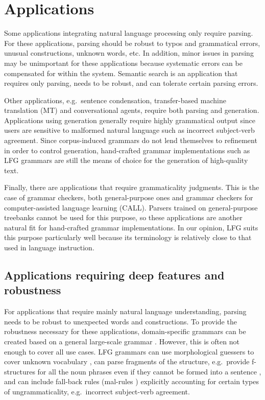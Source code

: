 \documentclass[output=paper,hidelinks]{langscibook}
\begin{document}
\section{Applications}
\label{sec:applications}

Some applications integrating natural language processing  only require parsing. For  these applications, parsing should be robust to typos and grammatical errors, unusual constructions, unknown words, etc. In addition, minor issues in parsing may be unimportant for these applications because systematic errors can be compensated for within the system. Semantic search is  an application that requires only parsing, needs to be robust, and can tolerate certain parsing errors.

Other applications, e.g.\ sentence condensation, transfer-based machine translation (MT) and conversational agents, require both parsing and generation. Applications using generation generally require highly grammatical output since users are sensitive to malformed natural language such as incorrect subject-verb agreement. Since corpus-induced grammars do not lend themselves to refinement in order to control generation, hand-crafted grammar implementations such as LFG grammars are still the means of choice for the generation of high-quality text.

Finally, there are applications that require grammaticality judgments. This is the case of grammar checkers, both general-purpose ones and grammar checkers for computer-assisted language learning (CALL). Parsers trained on general-purpose treebanks cannot be used for this purpose, so these applications are another natural fit for hand-crafted grammar implementations. In our opinion, LFG suits this purpose particularly well because its terminology is relatively close to that used in language instruction.

%

\subsection{Applications requiring deep features and robustness}
        
For applications that require mainly natural language understanding, parsing needs to be robust to unexpected words %
and constructions. To provide the robustness necessary for these applications, domain-specific grammars can be created based on a general large-scale grammar \citep{kimetal03,kingmaxwell07}. However, this is often not enough to cover all use cases. LFG grammars can use morphological guessers to cover unknown vocabulary \citep{dost-king-2009-using,boegelbuttking2019}, can parse fragments of the structure, e.g.\ provide f-structures for all the noun phrases even if they cannot be formed into a sentence \citep{riezleretal03}, and can include fall-back rules (mal-rules \cite{schneider-mccoy-1998-recognizing-syntactic,reuer03,khader03,fortmannforst04,Ben:Fli:Oep:Wal:Bal:04}) explicitly accounting for certain types of ungrammaticality, e.g.\ incorrect subject-verb agreement. 
\end{document}
